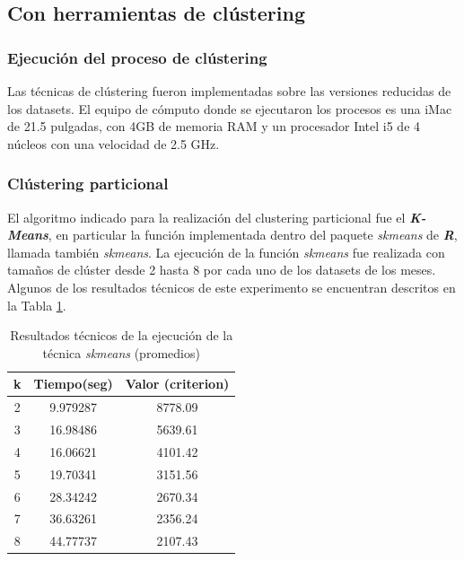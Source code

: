\documentclass[12pt]{article}
\numberwithin{equation}{section}
\numberwithin{table}{section}
\numberwithin{figure}{section}
\begin{document}
\pagebreak
\subsection{Con herramientas de clústering}
\subsubsection{Ejecución del proceso de clústering}
Las técnicas de clústering fueron implementadas sobre las versiones reducidas de los datasets. El equipo de cómputo donde se ejecutaron los procesos es una iMac de 21.5 pulgadas, con 4GB de memoria RAM y un procesador Intel i5 de 4 núcleos con una velocidad de 2.5 GHz.

\subsubsection{Clústering particional}
El algoritmo indicado para la realización del clustering particional fue el \textbf{\emph{K-Means}}, en particular la función implementada dentro del paquete \emph{skmeans} de \emph{\textbf{R}}, llamada también \emph{skmeans}.
La ejecución de la función \emph{skmeans} fue realizada con tamaños de clúster desde 2 hasta 8 por cada uno de los datasets de los meses.
Algunos de los resultados técnicos de este experimento se encuentran descritos en la Tabla \ref{tbl:resultados-particional}.

\begin{table}[h]
\centering
\begin{tabular}{@{}ccc@{}}
\toprule
\textbf{k} & \textbf{Tiempo(seg)} & \textbf{Valor (criterion)} \\ \midrule
2          & 9.979287             & 8778.09                    \\
3          & 16.98486             & 5639.61                    \\
4          & 16.06621             & 4101.42                    \\
5          & 19.70341             & 3151.56                    \\
6          & 28.34242             & 2670.34                    \\
7          & 36.63261             & 2356.24                    \\
8          & 44.77737             & 2107.43                    \\ \bottomrule
\end{tabular}
\caption{Resultados técnicos de la ejecución de la técnica \emph{skmeans} (promedios)}
\label{tbl:resultados-particional}
\end{table}
\end{document}
